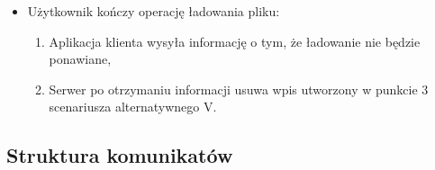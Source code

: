 \documentclass[10pt,a4paper]{article}
\begin{document}
\begin{itemize}
\begin{enumerate}
\begin{itemize}
            \item Użytkownik kończy operację ładowania pliku:
            \begin{enumerate}
                \item Aplikacja klienta wysyła informację o tym, że ładowanie nie będzie ponawiane,
                \item Serwer po otrzymaniu informacji usuwa wpis utworzony w punkcie 3 scenariusza alternatywnego V.
            \end{enumerate}
        \end{itemize}
    \end{enumerate}
\end{itemize}

\subsection{Struktura komunikatów}
\end{document}
